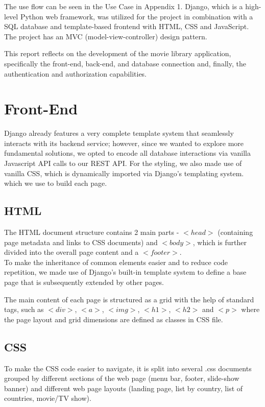 \documentclass[letterpaper,twocolumn]{article}
\begin{document}
The use flow can be seen in the Use Case in Appendix 1. Django, which is a high-level Python web framework, was utilized for the project in combination with a SQL database and template-based frontend with HTML, CSS and JavaScript. The project has an MVC (model-view-controller) design pattern.

This report reflects on the development of the movie library application, specifically the front-end, back-end, and database connection and, finally, the authentication and authorization capabilities. 

\section{Front-End}

Django already features a very complete template system that seamlessly interacts with its backend service; however, since we wanted to explore more fundamental solutions, we opted to encode all database interactions via vanilla Javascript API calls to our REST API. For the styling, we also made use of vanilla CSS, which is dynamically imported via Django's templating system. which we use to build each page.

\subsection{HTML}

The HTML document structure contains 2 main parts - $<head>$ (containing page metadata and links to CSS documents) and $<body>$, which is further divided into the overall page content and a $<footer>$. \\

To make the inheritance of common elements easier and to reduce code repetition, we made use of Django's built-in template system to define a base page that is subsequently extended by other pages.

The main content of each page is structured as a grid with the help of standard tags, such as $<div>$, $<a>$, $<img>$, $<h1>$, $<h2>$ and $<p>$ where the page layout and grid dimensions are defined as classes in CSS file.


\subsection{CSS}

To make the CSS code easier to navigate, it is split into several .css documents grouped by different sections of the web page (menu bar, footer, slide-show banner) and different web page layouts (landing page, list by country, list of countries, movie/TV show).
\end{document}

